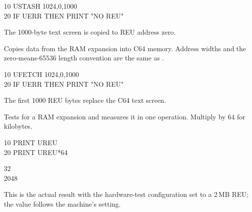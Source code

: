 \begin{referencechapter}
\begin{screen}
10 USTASH 1024,0,1000\\
20 IF UERR THEN PRINT "NO REU"
\end{screen}

\begin{resultbox}
The 1000-byte text screen is copied to REU address zero.
\end{resultbox}




Copies data from the RAM expansion into C64 memory. Address widths and the
zero-means-65536 length convention are the same as .

\begin{screen}
10 UFETCH 1024,0,1000\\
20 IF UERR THEN PRINT "NO REU"
\end{screen}

\begin{resultbox}
The first 1000 REU bytes replace the C64 text screen.
\end{resultbox}




Tests for a RAM expansion and measures it in one operation. Multiply by 64 for
kilobytes.

\begin{screen}
10 PRINT UREU\\
20 PRINT UREU*64
\end{screen}

\begin{outputbox}
 32\\
 2048
\end{outputbox}

This is the actual result with the hardware-test configuration set to a 2\,MB
REU; the value follows the machine's setting.


\end{referencechapter}
